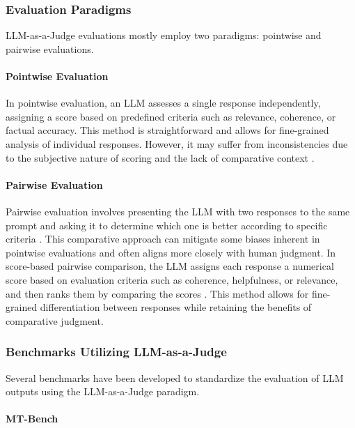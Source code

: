 \documentclass[sigconf, authoryear]{acmart}
\begin{document}
\subsubsection{Evaluation Paradigms}


LLM-as-a-Judge evaluations mostly employ two paradigms: pointwise and pairwise evaluations.


\paragraph{Pointwise Evaluation}


In pointwise evaluation, an LLM assesses a single response independently, assigning a score based on predefined criteria such as relevance, coherence, or factual accuracy.
This method is straightforward and allows for fine-grained analysis of individual responses.
However, it may suffer from inconsistencies due to the subjective nature of scoring and the lack of comparative context \cite{evalgen}.


\paragraph{Pairwise Evaluation}


Pairwise evaluation involves presenting the LLM with two responses to the same prompt and asking it to determine which one is better according to specific criteria \cite{liusie2024llmcomparativeassessmentzeroshot}.
This comparative approach can mitigate some biases inherent in pointwise evaluations and often aligns more closely with human judgment.
In score-based pairwise comparison, the LLM assigns each response a numerical score based on evaluation criteria such as coherence, helpfulness, or relevance, and then ranks them by comparing the scores \cite{liu2024aligning}.
This method allows for fine-grained differentiation between responses while retaining the benefits of comparative judgment.

\subsubsection{Benchmarks Utilizing LLM-as-a-Judge}


Several benchmarks have been developed to standardize the evaluation of LLM outputs using the LLM-as-a-Judge paradigm.


\paragraph{MT-Bench}
\end{document}
